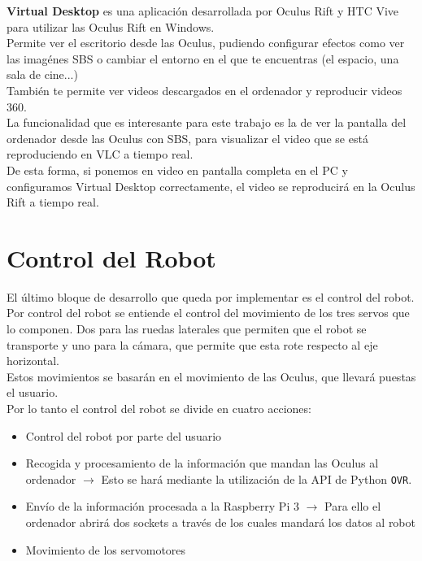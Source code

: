 \documentclass[twoside, 11pt]{epstfg}
\begin{document}
\textbf{Virtual Desktop} es una aplicación desarrollada por Oculus Rift y  HTC Vive para utilizar las Oculus Rift en Windows.\\
Permite ver el escritorio desde las Oculus, pudiendo configurar efectos como ver las imagénes SBS o cambiar el entorno en el que te encuentras (el espacio, una sala de cine...)\\También te permite ver videos descargados en el ordenador y reproducir videos 360.\\
La funcionalidad que es interesante para este trabajo es la de ver la pantalla del ordenador desde las Oculus con SBS, para visualizar el video que se está reproduciendo en VLC a tiempo real.\\
De esta forma, si ponemos en video en pantalla completa en el PC y configuramos Virtual Desktop correctamente, el video se reproducirá en la Oculus Rift a tiempo real.





\section{Control del Robot}
El último bloque de desarrollo que queda por implementar es el control del robot. Por control del robot se entiende el control del movimiento de los tres servos que lo componen. Dos para las ruedas laterales que permiten que el robot se transporte y uno para la cámara, que permite que esta rote respecto al eje horizontal.\\
Estos movimientos se basarán en el movimiento de las Oculus, que llevará puestas el usuario.\\
Por lo tanto el control del robot se divide en cuatro acciones:
\begin{itemize}
	\item Control del robot por parte del usuario
	\item Recogida y procesamiento de la información que mandan las Oculus al ordenador $\rightarrow$ Esto se hará mediante la utilización de la API de Python \texttt{OVR}.
	
	\item Envío de la información procesada a la Raspberry Pi 3 $\rightarrow$ Para ello el ordenador abrirá dos sockets a través de los cuales mandará los datos al robot
	
	\item Movimiento de los servomotores
\end{itemize}
\end{document}
